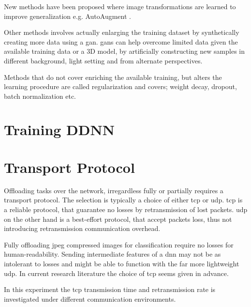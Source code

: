 New methods have been proposed where image transformations are learned to improve generalization e.g. AutoAugment \cite{cubuk_autoaugment:_2018}. 

Other methods involves actually enlarging the training dataset by synthetically creating more data using a \gls{gan}. \gls{gan}s can help overcome limited data given the available training data or a 3D model, by artificially constructing new samples in different background, light setting and from alternate perspectives.

Methods that do not cover enriching the available training, but alters the learning procedure are called regularization and covers; weight decay, dropout, batch normalization etc. 


\section{Training DDNN}

\section{Transport Protocol} 

Offloading tasks over the network, irregardless fully or partially requires a transport protocol. The selection is typically a choice of either \gls{tcp} or \gls{udp}. \gls{tcp} is a reliable protocol, that guarantee no losses by retransmission of lost packets. \gls{udp} on the other hand is a best-effort protocol, that accept packets loss, thus not introducing retransmission communication overhead. 


Fully offloading \gls{jpeg} compressed images for classification require no losses for human-readability. Sending intermediate features of a \gls{dnn} may not be as intolerant to losses and might be able to function with the far more lightweight \gls{udp}. In current research literature the choice of \gls{tcp} seems given in advance.  

In this experiment the \gls{tcp} transmission time and retransmission rate is investigated under different communication environments. 